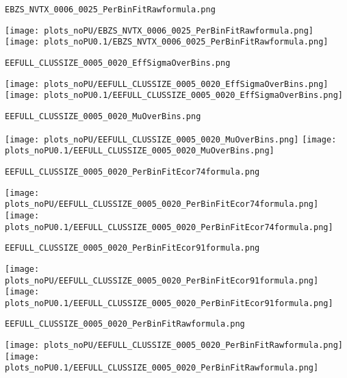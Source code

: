 \begin{frame}[fragile]
\begin{verbatim}
EBZS_NVTX_0006_0025_PerBinFitRawformula.png
\end{verbatim}
\texttt{[image: plots\_noPU/EBZS\_NVTX\_0006\_0025\_PerBinFitRawformula.png]}
\texttt{[image: plots\_noPU0.1/EBZS\_NVTX\_0006\_0025\_PerBinFitRawformula.png]}
\end{frame}
\begin{frame}[fragile]
\begin{verbatim}
EEFULL_CLUSSIZE_0005_0020_EffSigmaOverBins.png
\end{verbatim}
\texttt{[image: plots\_noPU/EEFULL\_CLUSSIZE\_0005\_0020\_EffSigmaOverBins.png]}
\texttt{[image: plots\_noPU0.1/EEFULL\_CLUSSIZE\_0005\_0020\_EffSigmaOverBins.png]}
\end{frame}
\begin{frame}[fragile]
\begin{verbatim}
EEFULL_CLUSSIZE_0005_0020_MuOverBins.png
\end{verbatim}
\texttt{[image: plots\_noPU/EEFULL\_CLUSSIZE\_0005\_0020\_MuOverBins.png]}
\texttt{[image: plots\_noPU0.1/EEFULL\_CLUSSIZE\_0005\_0020\_MuOverBins.png]}
\end{frame}
\begin{frame}[fragile]
\begin{verbatim}
EEFULL_CLUSSIZE_0005_0020_PerBinFitEcor74formula.png
\end{verbatim}
\texttt{[image: plots\_noPU/EEFULL\_CLUSSIZE\_0005\_0020\_PerBinFitEcor74formula.png]}
\texttt{[image: plots\_noPU0.1/EEFULL\_CLUSSIZE\_0005\_0020\_PerBinFitEcor74formula.png]}
\end{frame}
\begin{frame}[fragile]
\begin{verbatim}
EEFULL_CLUSSIZE_0005_0020_PerBinFitEcor91formula.png
\end{verbatim}
\texttt{[image: plots\_noPU/EEFULL\_CLUSSIZE\_0005\_0020\_PerBinFitEcor91formula.png]}
\texttt{[image: plots\_noPU0.1/EEFULL\_CLUSSIZE\_0005\_0020\_PerBinFitEcor91formula.png]}
\end{frame}
\begin{frame}[fragile]
\begin{verbatim}
EEFULL_CLUSSIZE_0005_0020_PerBinFitRawformula.png
\end{verbatim}
\texttt{[image: plots\_noPU/EEFULL\_CLUSSIZE\_0005\_0020\_PerBinFitRawformula.png]}
\texttt{[image: plots\_noPU0.1/EEFULL\_CLUSSIZE\_0005\_0020\_PerBinFitRawformula.png]}
\end{frame}
